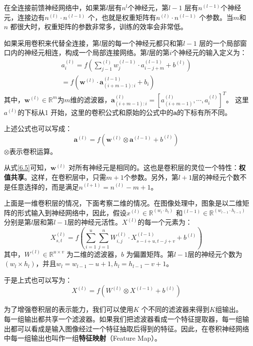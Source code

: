 \documentclass[11pt,fleqn, UTF8]{ctexbook} %
\begin{document}
在全连接前馈神经网络中，如果第$l $层有$n^l$个神经元，第$l-1$ 层有$n^{(l-1)}$个神经元，连接边有$n^{(l)}\cdot n^{(l-1)}$ 个，也就是权重矩阵有$n^{(l)}\cdot n^{(l-1)}$ 个参数。当$m$和$n$ 都很大时，权重矩阵的参数非常多，训练的效率会非常低。

如果采用卷积来代替全连接，第$l$层的每一个神经元都只和第$l-1$ 层的一个局部窗口内的神经元相连，构成一个局部连接网络。第$l$层的第$i$个神经元的输入定义为：
\begin{gather}\label{6.2}
  a_i^{(l)}=f\left( \sum_{j-1}^{(l)}{w_j^{(l-1)}\cdot a_{i-j+m}^{(l-1)}}+b^{(l)} \right) \\
  =f\left( \boldsymbol{w}^{(l)}\cdot \boldsymbol{a}_{(i+m-1):i}^{(l-1)}+b_i \right)
\end{gather}
其中，$\boldsymbol{w}^{(l)}\in \mathbb{R}^m$为$m$维的滤波器，$\boldsymbol{a}_{(i+m-1):i}^{(l)}=[a_{(i+m-1)}^{(l)},\cdots ,a_{i}^{(l)}]^T$。 这里$a^{(l)}$的下标从1 开始，这里的卷积公式和原始的公式中的$\boldsymbol{a}$的下标有所不同。

上述公式也可以写成：
\begin{equation}\label{6.5}
  \boldsymbol{a}^{(l)}=f(\boldsymbol{w}^{(l)}\otimes \boldsymbol{a}^{(l-1)}+b^{(l)})
\end{equation}
$\otimes$表示卷积运算。

从式\ref{6.5}可知，$\boldsymbol{w}^{(l)}$ 对所有神经元是相同的。这也是卷积层的灵位一个特性：\textbf{权值共享}。这样，在卷积层中，只需$m+1$个参数。另外，第$l+1$层的神经元个数不是任意选择的，而是满足$n^{(l+1)}=n^{(l)}-m+1$。

上面是一维卷积层的情况，下面考察二维的情况。在图像处理中，图象是以二维矩阵的形式输入到神经网络中，因此，假设$x^{(l)}\in \mathbb{R}^{(w_l\cdot h_l )}$ 和$ ^{(l-1)}\in \mathbb{R}^{(w_{l-1}\cdot h_{l-1})}$分别是第$l$层和第$l-1$层的神经元活性。$X^{(l)}$的每一个元素为：
\begin{equation}\label{6.6}
  X_{s,t}^{(l)}=f\left( \sum_{i=1}^u \sum_{j=1}^n{W_{i,j}^{(l)}\cdot X_{s-i+u,t-j+v}^{(l-1)}+b^{(l)}} \right)
\end{equation}
其中，$W^{(l)}\in \mathbb{R}^{u \times v}$ 为二维的滤波器，$b$ 为偏置矩阵。第$l-1$层的神经元个数为$(w_l\times h_l)$，并且$w_l=w_{l-1}-u+1, h_l=h_{l-1}-v+1$。

于是上式也可以写为：
\begin{equation}\label{6.7}
  X^{(l)}=f\left( W^{(l)} \otimes X^{(l-1)} +b^{(l)} \right)
\end{equation}

为了增强卷积层的表示能力，我们可以使用$K$ 个不同的滤波器来得到$K$组输出。每一组输出都共享一个滤波器。如果我们把滤波器看成一个特征提取器，每一组输出都可以看成是输入图像经过一个特征抽取后得到的特征。因此，在卷积神经网络中每一组输出也叫作一组\textbf{特征映射}（Feature Map）。
\end{document}
